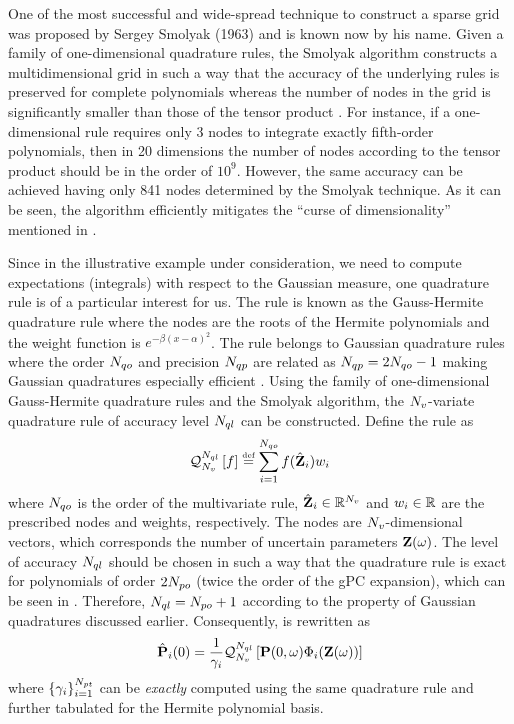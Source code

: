 One of the most successful and wide-spread technique to construct a sparse grid was proposed by Sergey Smolyak (1963) and is known now by his name. Given a family of one-dimensional quadrature rules, the Smolyak algorithm constructs a multidimensional grid in such a way that the accuracy of the underlying rules is preserved for complete polynomials whereas the number of nodes in the grid is significantly smaller than those of the tensor product \cite{heiss2008, eldred2009}. For instance, if a one-dimensional rule requires only 3 nodes to integrate exactly fifth-order polynomials, then in 20 dimensions the number of nodes according to the tensor product should be in the order of $10^9$. However, the same accuracy can be achieved having only 841 nodes determined by the Smolyak technique. As it can be seen, the algorithm efficiently mitigates the ``curse of dimensionality'' mentioned in .

Since in the illustrative example under consideration, we need to compute expectations (integrals) with respect to the Gaussian measure, one quadrature rule is of a particular interest for us. The rule is known as the Gauss-Hermite quadrature rule where the nodes are the roots of the Hermite polynomials and the weight function is $e^{-\beta (x - \alpha)^2}$. The rule belongs to Gaussian quadrature rules where the order $N_{qo}$ and precision $N_{qp}$ are related as $N_{qp} = 2 N_{qo} - 1$ making Gaussian quadratures especially efficient \cite{heiss2008}. Using the family of one-dimensional Gauss-Hermite quadrature rules and the Smolyak algorithm, the ${N_v}$-variate quadrature rule of accuracy level $N_{ql}$ can be constructed. Define the rule as
\[
  \mathcal{Q}_{{N_v}}^{N_{ql}}\left[f\right] \stackrel{\text{\tiny def}}{=} \sum_{i = 1}^{N_{qo}} f(\hat{\mathbf{Z}}_i) w_i
\]
where $N_{qo}$ is the order of the multivariate rule, $\hat{\mathbf{Z}}_i \in \mathbb{R}^{N_v}$ and $w_i \in \mathbb{R}$ are the prescribed nodes and weights, respectively. The nodes are ${N_v}$-dimensional vectors, which corresponds the number of uncertain parameters $\mathbf{Z}(\omega)$. The level of accuracy $N_{ql}$ should be chosen in such a way that the quadrature rule is exact for polynomials of order $2 {N_{po}}$ (twice the order of the gPC expansion), which can be seen in . Therefore, $N_{ql} = {N_{po}} + 1$ according to the property of Gaussian quadratures discussed earlier. Consequently,  is rewritten as
\[
  \hat{\mathbf{P}}_i(0) = \frac{1}{\gamma_i} \mathcal{Q}_{{N_v}}^{N_{ql}}\left[\mathbf{P}(0, \omega) \Phi_i(\mathbf{Z}(\omega))\right]
\]
where $\{ \gamma_i \}_{i = 1}^{{N_{pt}}}$ can be \emph{exactly} computed using the same quadrature rule and further tabulated for the Hermite polynomial basis.
